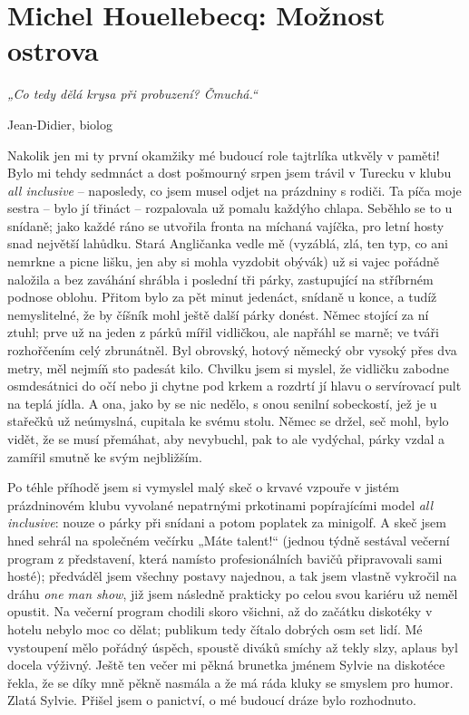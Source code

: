 \section{Michel Houellebecq: Možnost ostrova}

\textit{„Co tedy dělá krysa při probuzení? Čmuchá.“}

\begin{flushright}
Jean-Didier, biolog
\end{flushright}

\bigskip

\noindent
Nakolik jen mi ty první okamžiky mé budoucí role tajtrlíka utkvěly v paměti! Bylo mi tehdy sedmnáct a dost pošmourný srpen jsem trávil v Turecku v klubu  \textit{all inclusive} – naposledy, co jsem musel odjet na prázdniny s rodiči. Ta píča moje sestra – bylo jí třináct – rozpalovala už pomalu každýho chlapa. Seběhlo se to u snídaně; jako každé ráno se utvořila fronta na míchaná vajíčka, pro letní hosty snad největší lahůdku. Stará Angličanka vedle mě (vyzáblá, zlá, ten typ, co ani nemrkne a picne lišku, jen aby si mohla vyzdobit obývák) už si vajec pořádně naložila a bez zaváhání shrábla i poslední tři párky, zastupující na stříbrném podnose oblohu. Přitom bylo za pět minut jedenáct, snídaně u konce, a tudíž nemyslitelné, že by číšník mohl ještě další párky donést. Němec stojící za ní ztuhl; prve už na jeden z párků mířil vidličkou, ale napřáhl se marně; ve tváři rozhořčením celý zbrunátněl. Byl obrovský, hotový německý obr vysoký přes dva metry, měl nejmíň sto padesát kilo. Chvilku jsem si myslel, že vidličku zabodne osmdesátnici do očí nebo ji chytne pod krkem a rozdrtí jí hlavu o servírovací pult na teplá jídla. A ona, jako by se nic nedělo, s onou senilní sobeckostí, jež je u stařečků už neúmyslná, cupitala ke svému stolu. Němec se držel, seč mohl, bylo vidět, že se musí přemáhat, aby nevybuchl, pak to ale vydýchal, párky vzdal a zamířil smutně ke svým nejbližším.

Po téhle příhodě jsem si vymyslel malý skeč o krvavé vzpouře v jistém prázdninovém klubu vyvolané nepatrnými prkotinami popírajícími model  \textit{all inclusive}: nouze o párky při snídani a potom poplatek za minigolf. A skeč jsem hned sehrál na společném večírku „Máte talent!“ (jednou týdně sestával večerní program z představení, která namísto profesionálních bavičů připravovali sami hosté); předváděl jsem všechny postavy najednou, a tak jsem vlastně vykročil na dráhu  \textit{one man show}, již jsem následně prakticky po celou svou kariéru už neměl opustit. Na večerní program chodili skoro všichni, až do začátku diskotéky v hotelu nebylo moc co dělat; publikum tedy čítalo dobrých osm set lidí. Mé vystoupení mělo pořádný úspěch, spoustě diváků smíchy až tekly slzy, aplaus byl docela výživný. Ještě ten večer mi pěkná brunetka jménem Sylvie na diskotéce řekla, že se díky mně pěkně nasmála a že má ráda kluky se smyslem pro humor. Zlatá Sylvie. Přišel jsem o panictví, o mé budoucí dráze bylo rozhodnuto.

